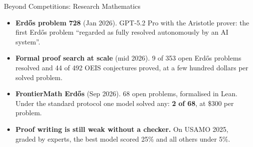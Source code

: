 \begin{frame}{Beyond Competitions: Research Mathematics}
    \begin{itemize}\itemsep0.5em
        \item \textbf{Erd\H{o}s problem 728} (Jan 2026). GPT-5.2 Pro with the Aristotle prover: the first Erd\H{o}s problem ``regarded as fully resolved autonomously by an AI system''.
        \item \textbf{Formal proof search at scale} (mid 2026). 9 of 353 open Erd\H{o}s problems resolved and 44 of 492 OEIS conjectures proved, at a few hundred dollars per solved problem.
        \item \textbf{FrontierMath Erd\H{o}s} (Sep 2026). 68 open problems, formalised in Lean. Under the standard protocol one model solved any: \textbf{2 of 68}, at \$300 per problem.
        \item \textbf{Proof writing is still weak without a checker.} On USAMO 2025, graded by experts, the best model scored 25\% and all others under 5\%.
    \end{itemize}
    \vspace{0.2em}
\end{frame}

